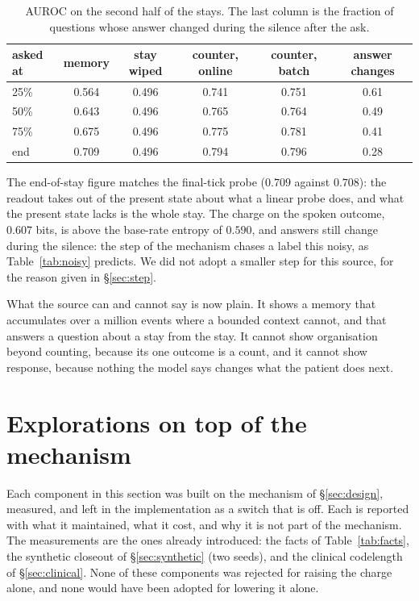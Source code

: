 \documentclass[11pt,a4paper]{article}
\theoremstyle{plain}
\theoremstyle{definition}
\theoremstyle{remark}
\begin{document}
\begin{table}[h]
\centering
\small
\begin{tabular}{lccccc}
\toprule
asked at & memory & stay wiped & counter, online & counter, batch & answer changes\\
\midrule
25\% & 0.564 & 0.496 & 0.741 & 0.751 & 0.61\\
50\% & 0.643 & 0.496 & 0.765 & 0.764 & 0.49\\
75\% & 0.675 & 0.496 & 0.775 & 0.781 & 0.41\\
end & 0.709 & 0.496 & 0.794 & 0.796 & 0.28\\
\bottomrule
\end{tabular}
\caption{AUROC on the second half of the stays. The last column is the fraction
of questions whose answer changed during the silence after the ask.}
\label{tab:bedside}
\end{table}

The end-of-stay figure matches the final-tick probe ($0.709$ against $0.708$):
the readout takes out of the present state about what a linear probe does, and
what the present state lacks is the whole stay. The charge on the spoken
outcome, $0.607$ bits, is above the base-rate entropy of $0.590$, and answers
still change during the silence: the step of the mechanism chases a label this
noisy, as Table~\ref{tab:noisy} predicts. We did not adopt a smaller step for
this source, for the reason given in \S\ref{sec:step}.

What the source can and cannot say is now plain. It shows a memory that
accumulates over a million events where a bounded context cannot, and that
answers a question about a stay from the stay. It cannot show organisation
beyond counting, because its one outcome is a count, and it cannot show
response, because nothing the model says changes what the patient does next.

\section{Explorations on top of the mechanism}
\label{sec:explore}

Each component in this section was built on the mechanism of
\S\ref{sec:design}, measured, and left in the implementation as a switch that
is off. Each is reported with what it maintained, what it cost, and why it is
not part of the mechanism. The measurements are the ones already introduced:
the facts of Table~\ref{tab:facts}, the synthetic closeout of
\S\ref{sec:synthetic} (two seeds), and the clinical codelength of
\S\ref{sec:clinical}. None of these components was rejected for raising the
charge alone, and none would have been adopted for lowering it alone.
\end{document}
